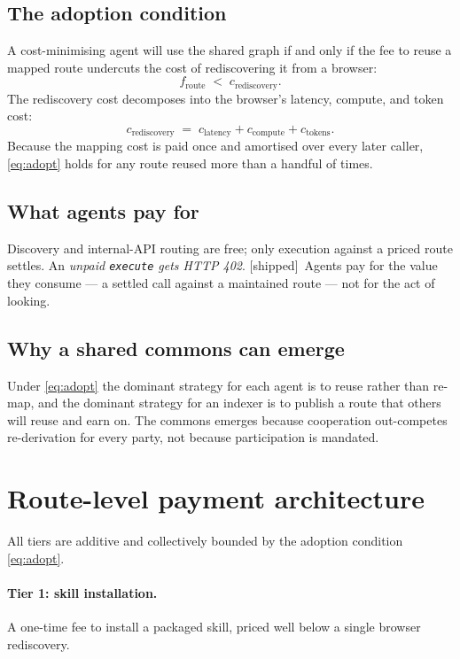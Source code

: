 \documentclass[11pt]{article}
\newcommand{\impl}{\textcolor{green!55!black}{\small[shipped]}}
\begin{document}
\subsection{The adoption condition}
A cost-minimising agent will use the shared graph if and only if the fee to reuse a
mapped route undercuts the cost of rediscovering it from a browser:
\begin{equation}
  f_{\text{route}} \;<\; c_{\text{rediscovery}}. \label{eq:adopt}
\end{equation}
The rediscovery cost decomposes into the browser's latency, compute, and token
cost:
\begin{equation}
  c_{\text{rediscovery}} \;=\; c_{\text{latency}} + c_{\text{compute}} +
  c_{\text{tokens}}. \label{eq:redis}
\end{equation}
Because the mapping cost is paid once and amortised over every later caller,
\eqref{eq:adopt} holds for any route reused more than a handful of times.

\subsection{What agents pay for}
Discovery and internal-API routing are free; only execution against a priced route
settles. An \emph{unpaid \texttt{execute} gets HTTP 402}. \impl\ Agents pay for the
value they consume --- a settled call against a maintained route --- not for the
act of looking.

\subsection{Why a shared commons can emerge}
Under \eqref{eq:adopt} the dominant strategy for each agent is to reuse rather than
re-map, and the dominant strategy for an indexer is to publish a route that others
will reuse and earn on. The commons emerges because cooperation out-competes
re-derivation for every party, not because participation is mandated.

\section{Route-level payment architecture}
All tiers are additive and collectively bounded by the adoption condition
\eqref{eq:adopt}.
\paragraph{Tier 1: skill installation.} A one-time fee to install a packaged skill,
priced well below a single browser rediscovery.
\end{document}
